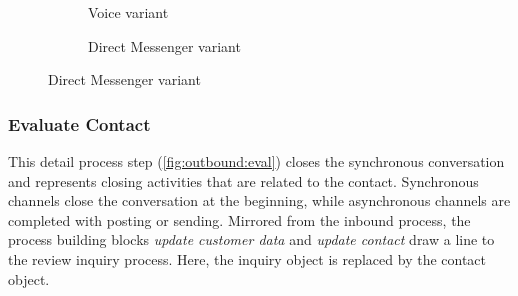 \begin{figure}[caption={Contact customer detail process}, label={fig:outbound:con}]
\begin{subfigure}[b]{.45\textwidth}
\begin{tikzpicture}
	 		\end{tikzpicture}
	 		\caption{Voice variant}\label{fig:outbound:con:voice}
	 	\end{subfigure}
	 	\begin{subfigure}[b]{.45\textwidth}
	 		\centering	
	 		\caption{Direct Messenger variant}\label{fig:outbound:con:dm}
	 	\end{subfigure}
	 \end{figure}
	 
	 
	 
	 \subsubsection{Evaluate Contact}
	 
	 This detail process step (\Fig \ref{fig:outbound:eval}) closes the synchronous conversation and represents closing activities that are related to the contact. Synchronous channels close the conversation at the beginning, while asynchronous channels are completed with posting or sending. Mirrored from the inbound process, the process building blocks \textit{update customer data} and \textit{update contact} draw a line to the review inquiry process. Here, the inquiry object is replaced by the contact object. 
	 
